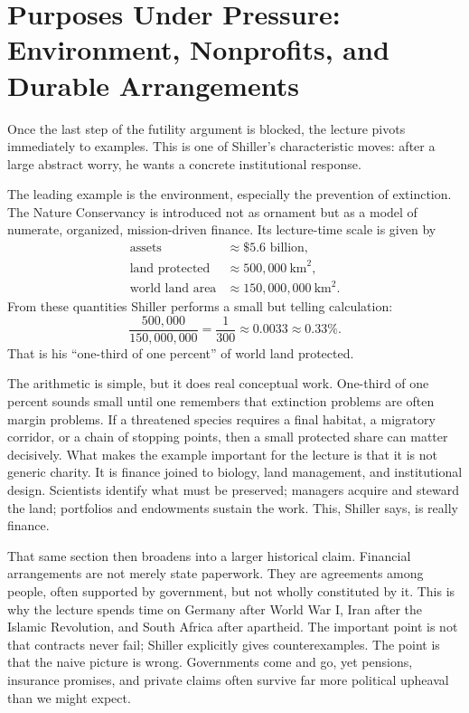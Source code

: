 \section{Purposes Under Pressure: Environment, Nonprofits, and Durable Arrangements}

Once the last step of the futility argument is blocked, the lecture pivots immediately to examples. This is one of Shiller's characteristic moves: after a large abstract worry, he wants a concrete institutional response.

The leading example is the environment, especially the prevention of extinction. The Nature Conservancy is introduced not as ornament but as a model of numerate, organized, mission-driven finance. Its lecture-time scale is given by
\begin{align}
\text{assets} &\approx \$5.6 \text{ billion},\\
\text{land protected} &\approx 500{,}000\ \text{km}^2,\\
\text{world land area} &\approx 150{,}000{,}000\ \text{km}^2.
\end{align}
From these quantities Shiller performs a small but telling calculation:
\begin{equation}
\frac{500{,}000}{150{,}000{,}000}
=
\frac{1}{300}
\approx 0.0033
\approx 0.33\%.
\end{equation}
That is his ``one-third of one percent'' of world land protected.

The arithmetic is simple, but it does real conceptual work. One-third of one percent sounds small until one remembers that extinction problems are often margin problems. If a threatened species requires a final habitat, a migratory corridor, or a chain of stopping points, then a small protected share can matter decisively. What makes the example important for the lecture is that it is not generic charity. It is finance joined to biology, land management, and institutional design. Scientists identify what must be preserved; managers acquire and steward the land; portfolios and endowments sustain the work. This, Shiller says, is really finance.

That same section then broadens into a larger historical claim. Financial arrangements are not merely state paperwork. They are agreements among people, often supported by government, but not wholly constituted by it. This is why the lecture spends time on Germany after World War I, Iran after the Islamic Revolution, and South Africa after apartheid. The important point is not that contracts never fail; Shiller explicitly gives counterexamples. The point is that the naive picture is wrong. Governments come and go, yet pensions, insurance promises, and private claims often survive far more political upheaval than we might expect.

